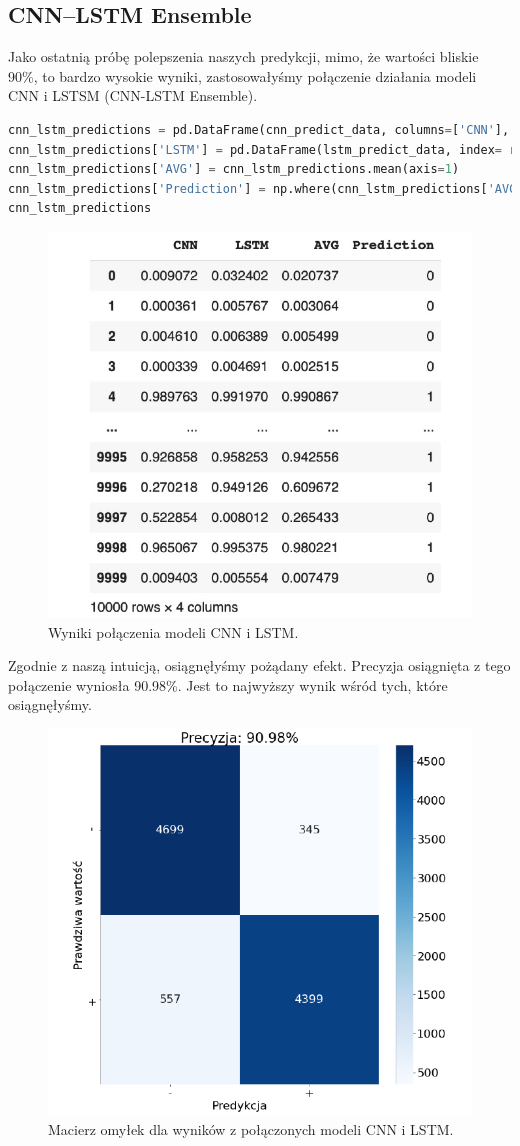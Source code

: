 \subsection{CNN--LSTM Ensemble}
Jako ostatnią próbę polepszenia naszych predykcji, mimo, że wartości bliskie 90\%, to bardzo wysokie wyniki, zastosowałyśmy połączenie działania modeli CNN i LSTSM (CNN-LSTM Ensemble).

\begin{lstlisting}[language=Python,frame=single, breaklines=true, caption=Model stworzony przez połączenie CCN z LSTM.,label=code:cnn-lstm]
cnn_lstm_predictions = pd.DataFrame(cnn_predict_data, columns=['CNN'], index= range(0,len(test_data)))
cnn_lstm_predictions['LSTM'] = pd.DataFrame(lstm_predict_data, index= range(0,len(test_data)))
cnn_lstm_predictions['AVG'] = cnn_lstm_predictions.mean(axis=1)
cnn_lstm_predictions['Prediction'] = np.where(cnn_lstm_predictions['AVG']>0.5, 1, 0)
cnn_lstm_predictions
\end{lstlisting}


\begin{figure}[H]
	\centering
	\includegraphics[width=0.55\linewidth]{images/chapter3/cnn-lstm.pdf}
	\caption{Wyniki połączenia modeli CNN i LSTM.}
	\label{fig:cnn-lstm}
\end{figure}


\noindent Zgodnie z naszą intuicją, osiągnęłyśmy pożądany efekt. Precyzja osiągnięta z tego połączenie wyniosła 90.98\%. Jest to najwyższy wynik wśród tych, które osiągnęłyśmy.

\begin{figure}[H]
	\centering
	\includegraphics[width=0.55\linewidth]{images/chapter3/cnn-lstm-macierz.pdf}
	\caption{Macierz omyłek dla wyników z połączonych modeli CNN i LSTM.}
	\label{fig:cnn-lstm-macierz}
\end{figure}

